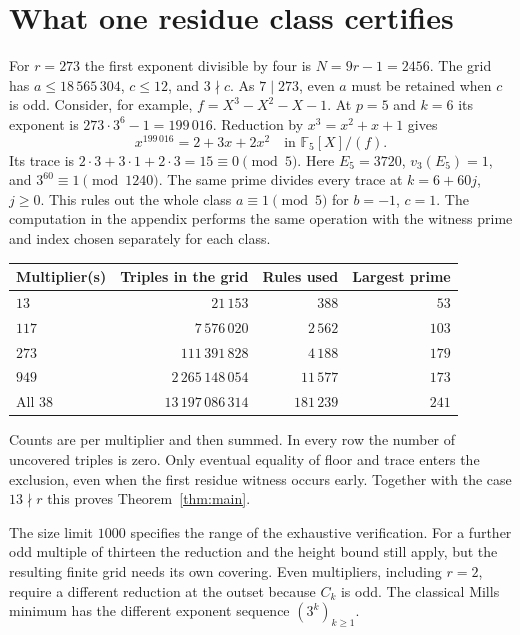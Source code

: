 \documentclass[11pt]{article}
\begin{document}
\section{What one residue class certifies}
For $r=273$ the first exponent divisible by four is $N=9r-1=2456$.
The grid has $a\le18\,565\,304$, $c\le12$, and $3\nmid c$.
As $7\mid273$, even $a$ must be retained when $c$ is odd.
Consider, for example, $f=X^3-X^2-X-1$. At $p=5$ and $k=6$ its exponent is
$273\cdot3^6-1=199\,016$. Reduction by $x^3=x^2+x+1$ gives
\[
 x^{199\,016}=2+3x+2x^2\quad\text{in }\mathbb F_5[X]/(f).
\]
Its trace is $2\cdot3+3\cdot1+2\cdot3=15\equiv0\pmod5$.
Here $E_5=3720$, $v_3(E_5)=1$, and $3^{60}\equiv1\pmod{1240}$.
The same prime divides every trace at $k=6+60j$, $j\ge0$. This rules
out the whole class $a\equiv1\pmod5$ for $b=-1$, $c=1$.
The computation in the appendix performs the same operation with the
witness prime and index chosen separately for each class.

\begin{center}
\begin{tabular}{lrrr}\toprule
Multiplier(s) & Triples in the grid & Rules used & Largest prime\\\midrule
$13$ & $21\,153$ & $388$ & $53$\\
$117$ & $7\,576\,020$ & $2\,562$ & $103$\\
$273$ & $111\,391\,828$ & $4\,188$ & $179$\\
$949$ & $2\,265\,148\,054$ & $11\,577$ & $173$\\\midrule
All 38 & $13\,197\,086\,314$ & $181\,239$ & $241$\\\bottomrule
\end{tabular}
\end{center}
Counts are per multiplier and then summed. In every row the number of
uncovered triples is zero. Only eventual equality of floor and trace
enters the exclusion, even when the first residue witness occurs early.
Together with the case $13\nmid r$ this proves Theorem~\ref{thm:main}.

The size limit $1000$ specifies the range of the exhaustive verification.
For a further odd multiple of thirteen the reduction and the height bound
still apply, but the resulting finite grid needs its own covering.
Even multipliers, including $r=2$, require a different reduction at
the outset because $C_k$ is odd. The classical Mills minimum has the
different exponent sequence $(3^k)_{k\ge1}$.
\end{document}
